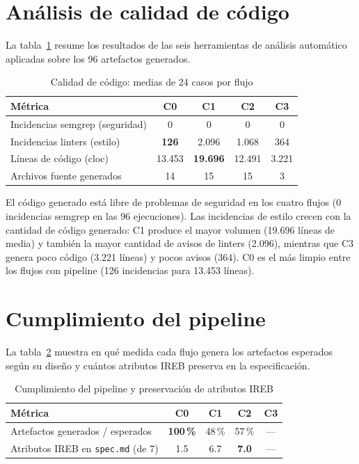 \section{An\'alisis de calidad de c\'odigo}

La tabla~\ref{tab:calidad-global} resume los resultados de las seis herramientas de an\'alisis autom\'atico aplicadas sobre los 96 artefactos generados.

\begin{table}[htbp]
\centering
\caption{Calidad de c\'odigo: medias de 24 casos por flujo}
\label{tab:calidad-global}
\begin{tabular}{lcccc}
\toprule
\textbf{M\'etrica} & \textbf{C0} & \textbf{C1} & \textbf{C2} & \textbf{C3} \\
\midrule
Incidencias semgrep (seguridad) & 0 & 0 & 0 & 0 \\
Incidencias linters (estilo) & \textbf{126} & 2.096 & 1.068 & 364 \\
L\'ineas de c\'odigo (cloc) & 13.453 & \textbf{19.696} & 12.491 & 3.221 \\
Archivos fuente generados & 14 & 15 & 15 & 3 \\
\bottomrule
\end{tabular}
\end{table}

El c\'odigo generado est\'a libre de problemas de seguridad en los cuatro flujos (0 incidencias semgrep en las 96 ejecuciones). Las incidencias de estilo crecen con la cantidad de c\'odigo generado: C1 produce el mayor volumen (19.696 l\'ineas de media) y tambi\'en la mayor cantidad de avisos de linters (2.096), mientras que C3 genera poco c\'odigo (3.221 l\'ineas) y pocos avisos (364). C0 es el m\'as limpio entre los flujos con pipeline (126 incidencias para 13.453 l\'ineas).

\FloatBarrier
\section{Cumplimiento del pipeline}

La tabla~\ref{tab:cumplimiento} muestra en qu\'e medida cada flujo genera los artefactos esperados seg\'un su dise\~no y cu\'antos atributos IREB preserva en la especificaci\'on.

\begin{table}[htbp]
\centering
\caption{Cumplimiento del pipeline y preservaci\'on de atributos IREB}
\label{tab:cumplimiento}
\begin{tabular}{lcccc}
\toprule
\textbf{M\'etrica} & \textbf{C0} & \textbf{C1} & \textbf{C2} & \textbf{C3} \\
\midrule
Artefactos generados / esperados & \textbf{100\,\%} & 48\,\% & 57\,\% & --- \\
Atributos IREB en \texttt{spec.md} (de 7) & 1.5 & 6.7 & \textbf{7.0} & --- \\
\midrule
\end{tabular}
\end{table}

